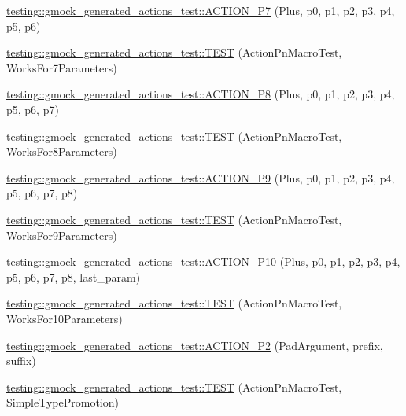 \begin{DoxyCompactItemize}
\item 
\mbox{\hyperlink{namespacetesting_1_1gmock__generated__actions__test_a58bc376a0637fc1e89e6503466d1b9cd}{testing\+::gmock\+\_\+generated\+\_\+actions\+\_\+test\+::\+A\+C\+T\+I\+O\+N\+\_\+\+P7}} (Plus, p0, p1, p2, p3, p4, p5, p6)
\item 
\mbox{\hyperlink{namespacetesting_1_1gmock__generated__actions__test_add3cba52186c7ce384808c222492ee18}{testing\+::gmock\+\_\+generated\+\_\+actions\+\_\+test\+::\+T\+E\+ST}} (Action\+Pn\+Macro\+Test, Works\+For7\+Parameters)
\item 
\mbox{\hyperlink{namespacetesting_1_1gmock__generated__actions__test_ad8766a6dbaeffbf36658d3b5f75d3b00}{testing\+::gmock\+\_\+generated\+\_\+actions\+\_\+test\+::\+A\+C\+T\+I\+O\+N\+\_\+\+P8}} (Plus, p0, p1, p2, p3, p4, p5, p6, p7)
\item 
\mbox{\hyperlink{namespacetesting_1_1gmock__generated__actions__test_a1913bedf1d5cf736e91f2be119de0d5f}{testing\+::gmock\+\_\+generated\+\_\+actions\+\_\+test\+::\+T\+E\+ST}} (Action\+Pn\+Macro\+Test, Works\+For8\+Parameters)
\item 
\mbox{\hyperlink{namespacetesting_1_1gmock__generated__actions__test_ab023ad5e95ca2c2b8845963ce7222e00}{testing\+::gmock\+\_\+generated\+\_\+actions\+\_\+test\+::\+A\+C\+T\+I\+O\+N\+\_\+\+P9}} (Plus, p0, p1, p2, p3, p4, p5, p6, p7, p8)
\item 
\mbox{\hyperlink{namespacetesting_1_1gmock__generated__actions__test_a52d6dc447a4a71524adfeb7c8f7b6a68}{testing\+::gmock\+\_\+generated\+\_\+actions\+\_\+test\+::\+T\+E\+ST}} (Action\+Pn\+Macro\+Test, Works\+For9\+Parameters)
\item 
\mbox{\hyperlink{namespacetesting_1_1gmock__generated__actions__test_a3c6e7ef6aefc94efc9e815e92f0b3e47}{testing\+::gmock\+\_\+generated\+\_\+actions\+\_\+test\+::\+A\+C\+T\+I\+O\+N\+\_\+\+P10}} (Plus, p0, p1, p2, p3, p4, p5, p6, p7, p8, last\+\_\+param)
\item 
\mbox{\hyperlink{namespacetesting_1_1gmock__generated__actions__test_a564fd77344f58b26577452a380c93935}{testing\+::gmock\+\_\+generated\+\_\+actions\+\_\+test\+::\+T\+E\+ST}} (Action\+Pn\+Macro\+Test, Works\+For10\+Parameters)
\item 
\mbox{\hyperlink{namespacetesting_1_1gmock__generated__actions__test_ad58030fe83ad47cdb4ff027f8399adb4}{testing\+::gmock\+\_\+generated\+\_\+actions\+\_\+test\+::\+A\+C\+T\+I\+O\+N\+\_\+\+P2}} (Pad\+Argument, prefix, suffix)
\item 
\mbox{\hyperlink{namespacetesting_1_1gmock__generated__actions__test_ad42236ad6c6d01fad6dd947ca6163d59}{testing\+::gmock\+\_\+generated\+\_\+actions\+\_\+test\+::\+T\+E\+ST}} (Action\+Pn\+Macro\+Test, Simple\+Type\+Promotion)

\end{DoxyCompactItemize}

